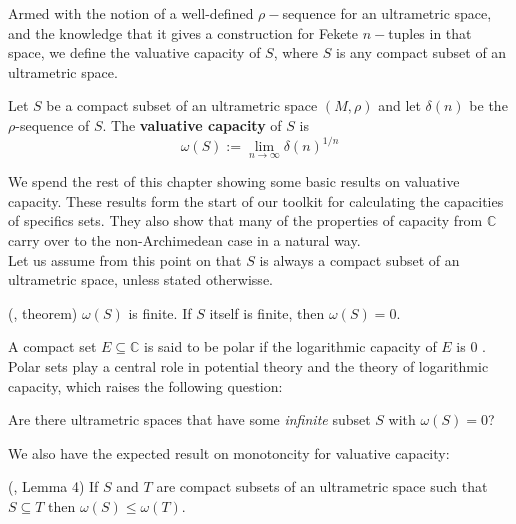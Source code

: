 Armed with the notion of a well-defined $\rho-$sequence for an ultrametric space, and the knowledge that it gives a construction for Fekete $n-$tuples in that space, we define the valuative capacity of $S$, where $S$ is any compact subset of an ultrametric space.\\

\begin{definition}
	\cite{kj}  Let $S$ be a compact subset of an ultrametric space $(M,\rho)$ and let $\delta(n)$ be the $\rho$-sequence of $S$. The \textbf{valuative capacity} of $S$ is \[\omega(S)
	:= \lim_{n\to\infty} \delta(n)^{1/n}\]  
\end{definition}

We spend the rest of this chapter showing some basic results on valuative capacity. These results form the start of our toolkit for calculating the capacities of specifics sets. They also show that many of the properties of capacity from $\mathbb{C}$ carry over to the non-Archimedean case in a natural way. \\

Let us assume from this point on that $S$ is always a compact subset of an ultrametric space, unless stated otherwisse.\\ 

\begin{proposition}
	(\cite{kj}, theorem) $\omega(S)$ is finite. If $S$ itself is finite, then $\omega(S) =0$.
\end{proposition}

A compact set $E \subseteq \mathbb{C}$ is said to be polar if the logarithmic capacity of $E$ is $0$ \cite{rand}. Polar sets play a central role in potential theory and the theory of logarithmic capacity, which raises the following question:\\

\begin{question}
Are there ultrametric spaces that have some \textit{infinite} subset $S$ with $\omega(S)=0$?
\end{question}

We also have the expected result on monotoncity for valuative capacity:\\

\begin{proposition}
	(\cite{kj}, Lemma 4) If $S$ and $T$ are compact subsets of an ultrametric space such that $S \subseteq T$ then $\omega(S) \leq \omega(T)$. 
\end{proposition}


